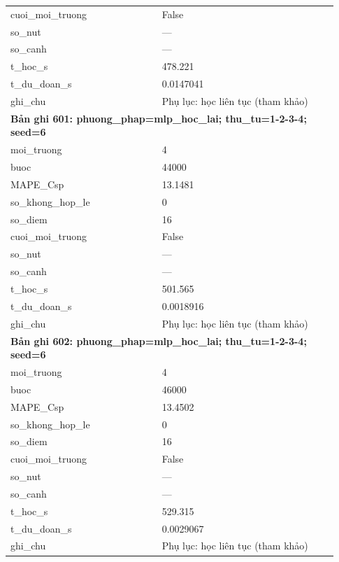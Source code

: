 \begin{longtable}{p{0.43\linewidth}p{0.50\linewidth}}
cuoi\_\allowbreak moi\_\allowbreak truong & False \\
so\_\allowbreak nut & — \\
so\_\allowbreak canh & — \\
t\_\allowbreak hoc\_\allowbreak s & 478.221 \\
t\_\allowbreak du\_\allowbreak doan\_\allowbreak s & 0.0147041 \\
ghi\_\allowbreak chu & Phụ lục: học liên tục (tham khảo) \\
\midrule
\multicolumn{2}{p{0.95\linewidth}}{\textbf{Bản ghi 601: phuong\_phap=mlp\_hoc\_lai; thu\_tu=1-2-3-4; seed=6}} \\
moi\_\allowbreak truong & 4 \\
buoc & 44000 \\
MAPE\_\allowbreak Csp & 13.1481 \\
so\_\allowbreak khong\_\allowbreak hop\_\allowbreak le & 0 \\
so\_\allowbreak diem & 16 \\
cuoi\_\allowbreak moi\_\allowbreak truong & False \\
so\_\allowbreak nut & — \\
so\_\allowbreak canh & — \\
t\_\allowbreak hoc\_\allowbreak s & 501.565 \\
t\_\allowbreak du\_\allowbreak doan\_\allowbreak s & 0.0018916 \\
ghi\_\allowbreak chu & Phụ lục: học liên tục (tham khảo) \\
\midrule
\multicolumn{2}{p{0.95\linewidth}}{\textbf{Bản ghi 602: phuong\_phap=mlp\_hoc\_lai; thu\_tu=1-2-3-4; seed=6}} \\
moi\_\allowbreak truong & 4 \\
buoc & 46000 \\
MAPE\_\allowbreak Csp & 13.4502 \\
so\_\allowbreak khong\_\allowbreak hop\_\allowbreak le & 0 \\
so\_\allowbreak diem & 16 \\
cuoi\_\allowbreak moi\_\allowbreak truong & False \\
so\_\allowbreak nut & — \\
so\_\allowbreak canh & — \\
t\_\allowbreak hoc\_\allowbreak s & 529.315 \\
t\_\allowbreak du\_\allowbreak doan\_\allowbreak s & 0.0029067 \\
ghi\_\allowbreak chu & Phụ lục: học liên tục (tham khảo) \\

\end{longtable}

